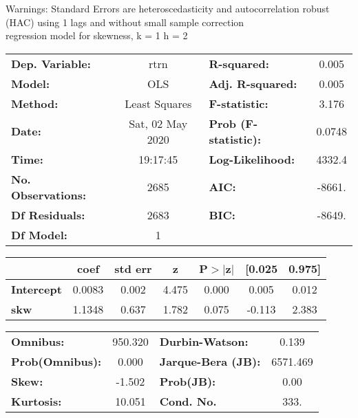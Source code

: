Warnings: \newline
 [1] Standard Errors are heteroscedasticity and autocorrelation robust (HAC) using 1 lags and without small sample correction\\ 

regression model for skewness, k = 1 h = 2\begin{center}
\begin{tabular}{lclc}
\toprule
\textbf{Dep. Variable:}    &       rtrn       & \textbf{  R-squared:         } &     0.005   \\
\textbf{Model:}            &       OLS        & \textbf{  Adj. R-squared:    } &     0.005   \\
\textbf{Method:}           &  Least Squares   & \textbf{  F-statistic:       } &     3.176   \\
\textbf{Date:}             & Sat, 02 May 2020 & \textbf{  Prob (F-statistic):} &   0.0748    \\
\textbf{Time:}             &     19:17:45     & \textbf{  Log-Likelihood:    } &    4332.4   \\
\textbf{No. Observations:} &        2685      & \textbf{  AIC:               } &    -8661.   \\
\textbf{Df Residuals:}     &        2683      & \textbf{  BIC:               } &    -8649.   \\
\textbf{Df Model:}         &           1      & \textbf{                     } &             \\
\bottomrule
\end{tabular}
\begin{tabular}{lcccccc}
                   & \textbf{coef} & \textbf{std err} & \textbf{z} & \textbf{P$> |$z$|$} & \textbf{[0.025} & \textbf{0.975]}  \\
\midrule
\textbf{Intercept} &       0.0083  &        0.002     &     4.475  &         0.000        &        0.005    &        0.012     \\
\textbf{skw}       &       1.1348  &        0.637     &     1.782  &         0.075        &       -0.113    &        2.383     \\
\bottomrule
\end{tabular}
\begin{tabular}{lclc}
\textbf{Omnibus:}       & 950.320 & \textbf{  Durbin-Watson:     } &    0.139  \\
\textbf{Prob(Omnibus):} &   0.000 & \textbf{  Jarque-Bera (JB):  } & 6571.469  \\
\textbf{Skew:}          &  -1.502 & \textbf{  Prob(JB):          } &     0.00  \\
\textbf{Kurtosis:}      &  10.051 & \textbf{  Cond. No.          } &     333.  \\
\bottomrule
\end{tabular}
\end{center}

